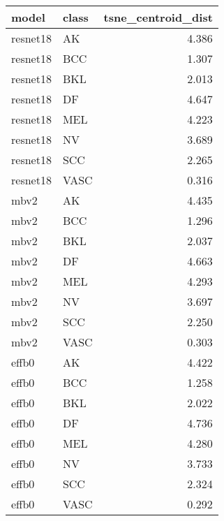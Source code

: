 \begin{tabular}{llr}
\toprule
model & class & tsne_centroid_dist \\
\midrule
resnet18 & AK & 4.386 \\
resnet18 & BCC & 1.307 \\
resnet18 & BKL & 2.013 \\
resnet18 & DF & 4.647 \\
resnet18 & MEL & 4.223 \\
resnet18 & NV & 3.689 \\
resnet18 & SCC & 2.265 \\
resnet18 & VASC & 0.316 \\
mbv2 & AK & 4.435 \\
mbv2 & BCC & 1.296 \\
mbv2 & BKL & 2.037 \\
mbv2 & DF & 4.663 \\
mbv2 & MEL & 4.293 \\
mbv2 & NV & 3.697 \\
mbv2 & SCC & 2.250 \\
mbv2 & VASC & 0.303 \\
effb0 & AK & 4.422 \\
effb0 & BCC & 1.258 \\
effb0 & BKL & 2.022 \\
effb0 & DF & 4.736 \\
effb0 & MEL & 4.280 \\
effb0 & NV & 3.733 \\
effb0 & SCC & 2.324 \\
effb0 & VASC & 0.292 \\
\bottomrule
\end{tabular}
